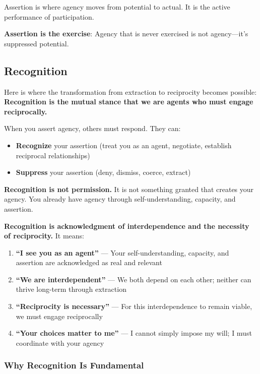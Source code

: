 \documentclass[12pt,a4paper]{article}
\begin{document}
Assertion is where agency moves from potential to actual. It is the active performance of participation.

\textbf{Assertion is the exercise}: Agency that is never exercised is not agency—it's suppressed potential.

\subsection{Recognition}

Here is where the transformation from extraction to reciprocity becomes possible: \textbf{Recognition is the mutual stance that we are agents who must engage reciprocally.}

When you assert agency, others must respond. They can:

\begin{itemize}
    \item \textbf{Recognize} your assertion (treat you as an agent, negotiate, establish reciprocal relationships)
    \item \textbf{Suppress} your assertion (deny, dismiss, coerce, extract)
\end{itemize}

\textbf{Recognition is not permission.} It is not something granted that creates your agency. You already have agency through self-understanding, capacity, and assertion.

\textbf{Recognition is acknowledgment of interdependence and the necessity of reciprocity.} It means:

\begin{enumerate}
    \item \textbf{``I see you as an agent''} — Your self-understanding, capacity, and assertion are acknowledged as real and relevant
    \item \textbf{``We are interdependent''} — We both depend on each other; neither can thrive long-term through extraction
    \item \textbf{``Reciprocity is necessary''} — For this interdependence to remain viable, we must engage reciprocally
    \item \textbf{``Your choices matter to me''} — I cannot simply impose my will; I must coordinate with your agency
\end{enumerate}

\subsubsection*{Why Recognition Is Fundamental}
\end{document}
